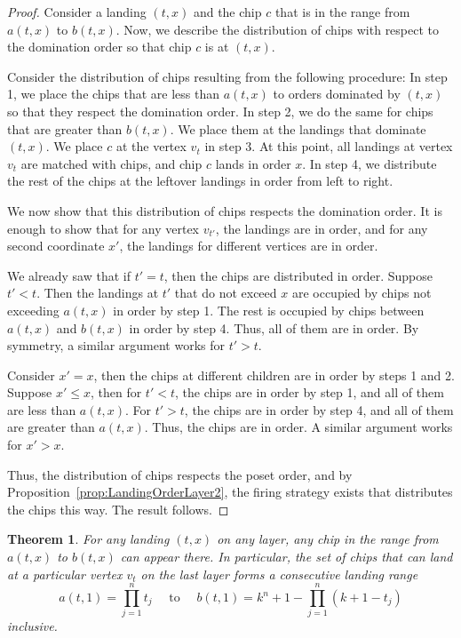 \documentclass[11pt]{article}
\newtheorem{theorem}{Theorem}[section] %
\theoremstyle{definition}
\theoremstyle{remark}
\begin{document}
\begin{proof}
    Consider a landing $(t,x)$ and the chip $c$ that is in the range from $a(t,x)$ to $b(t,x)$. Now, we describe the distribution of chips with respect to the domination order so that chip $c$ is at $(t,x)$.

    Consider the distribution of chips resulting from the following procedure: In step 1, we place the chips that are less than $a(t,x)$ to orders dominated by $(t,x)$ so that they respect the domination order. In step 2, we do the same for chips that are greater than $b(t,x)$. We place them at the landings that dominate $(t,x)$. We place $c$ at the vertex $v_t$ in step 3. At this point, all landings at vertex $v_t$ are matched with chips, and chip $c$ lands in order $x$. In step 4, we distribute the rest of the chips at the leftover landings in order from left to right.

    We now show that this distribution of chips respects the domination order. It is enough to show that for any vertex $v_{t'}$, the landings are in order, and for any second coordinate $x'$, the landings for different vertices are in order.

    We already saw that if $t' = t$, then the chips are distributed in order. Suppose $t' < t$. Then the landings at $t'$ that do not exceed $x$ are occupied by chips not exceeding $a(t,x)$ in order by step 1. The rest is occupied by chips between $a(t,x)$ and $b(t,x)$ in order by step 4. Thus, all of them are in order. By symmetry, a similar argument works for $t' > t$.

    Consider $x' = x$, then the chips at different children are in order by steps 1 and 2. Suppose $x' \leq x$, then for $t' < t$, the chips are in order by step 1, and all of them are less than $a(t,x)$. For $t' > t$, the chips are in order by step 4, and all of them are greater than $a(t,x)$. Thus, the chips are in order. A similar argument works for $x' > x$.

    Thus, the distribution of chips respects the poset order, and by Proposition~\ref{prop:LandingOrderLayer2}, the firing strategy exists that distributes the chips this way. The result follows.
\end{proof}

\begin{theorem}
\label{thm:ranges}
    For any landing $(t,x)$ on any layer, any chip in the range from $a(t,x)$ to $b(t,x)$ can appear there. In particular, the set of chips that can land at a particular vertex $v_t$ on the last layer forms a consecutive landing range
    \[a(t, 1) = \prod_{j=1}^n t_j \quad \textrm{ to } \quad b(t, 1) = k^n+1-\prod_{j=1}^n(k+1-t_j)\] inclusive. 
\end{theorem}
\end{document}
